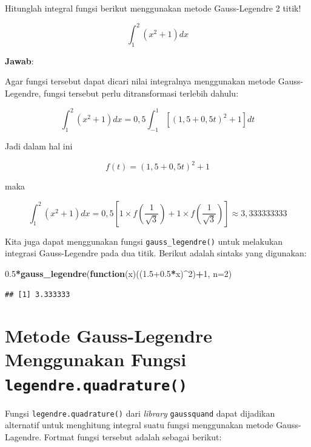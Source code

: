 \documentclass[]{book}
\newenvironment{Shaded}{\begin{snugshade}}{\end{snugshade}}
\newcommand{\ControlFlowTok}[1]{\textcolor[rgb]{0.13,0.29,0.53}{\textbf{#1}}}
\newcommand{\DataTypeTok}[1]{\textcolor[rgb]{0.13,0.29,0.53}{#1}}
\newcommand{\DecValTok}[1]{\textcolor[rgb]{0.00,0.00,0.81}{#1}}
\newcommand{\FloatTok}[1]{\textcolor[rgb]{0.00,0.00,0.81}{#1}}
\newcommand{\KeywordTok}[1]{\textcolor[rgb]{0.13,0.29,0.53}{\textbf{#1}}}
\newcommand{\NormalTok}[1]{#1}
\newcommand{\OperatorTok}[1]{\textcolor[rgb]{0.81,0.36,0.00}{\textbf{#1}}}
\theoremstyle{definition}
\theoremstyle{definition}
\theoremstyle{definition}
\theoremstyle{remark}
\let\BeginKnitrBlock\begin \let\EndKnitrBlock\end
\begin{document}
\BeginKnitrBlock{example}
\protect\hypertarget{exm:gausslanexm}{}{\label{exm:gausslanexm} }Hitunglah integral fungsi berikut menggunakan metode Gauss-Legendre 2 titik!
\EndKnitrBlock{example}

\[
\int_1^2 \left(x^2+1\right)dx
\]

\textbf{Jawab}:

Agar fungsi tersebut dapat dicari nilai integralnya menggunakan metode Gauss-Legendre, fungsi tersebut perlu ditransformasi terlebih dahulu:

\[
\int_1^2 \left(x^2+1\right)dx=0,5\int_{-1}^1 \left[\left(1,5+0,5t\right)^2+1\right]dt
\]

Jadi dalam hal ini

\[
f\left(t\right)=\left(1,5+0,5t\right)^2+1
\]

maka

\[
\int_1^2 \left(x^2+1\right)dx=0,5\left[1\times f\left(\frac{1}{\sqrt{3}}\right)+1\times f\left(\frac{1}{\sqrt{3}}\right)\right]\approx 3,333333333
\]

Kita juga dapat menggunakan fungsi \texttt{gauss\_legendre()} untuk melakukan integrasi Gauss-Legendre pada dua titik. Berikut adalah sintaks yang digunakan:

\begin{Shaded}
\begin{Highlighting}[]
\FloatTok{0.5}\OperatorTok{*}\KeywordTok{gauss_legendre}\NormalTok{(}\ControlFlowTok{function}\NormalTok{(x)((}\FloatTok{1.5+0.5}\OperatorTok{*}\NormalTok{x)}\OperatorTok{^}\DecValTok{2}\NormalTok{)}\OperatorTok{+}\DecValTok{1}\NormalTok{,}
               \DataTypeTok{n=}\DecValTok{2}\NormalTok{)}
\end{Highlighting}
\end{Shaded}

\begin{verbatim}
## [1] 3.333333
\end{verbatim}

\hypertarget{othergauss}{%
\section{\texorpdfstring{Metode Gauss-Legendre Menggunakan Fungsi \texttt{legendre.quadrature()}}{Metode Gauss-Legendre Menggunakan Fungsi legendre.quadrature()}}\label{othergauss}}

Fungsi \texttt{legendre.quadrature()} dari \emph{library} \texttt{gaussquand} dapat dijadikan alternatif untuk menghitung integral suatu fungsi menggunakan metode Gauss-Lagendre. Fortmat fungsi tersebut adalah sebagai berikut:
\end{document}
